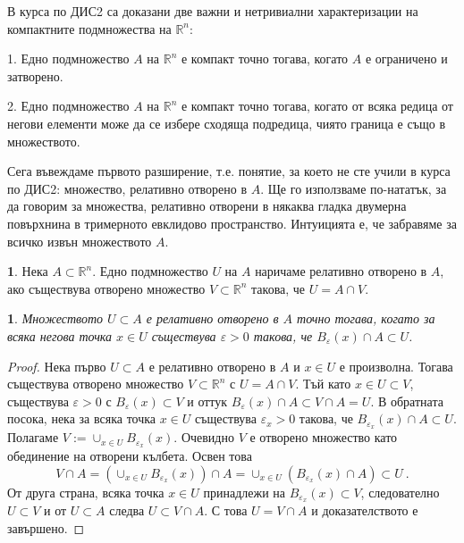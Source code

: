 \documentclass[11pt]{article}
\numberwithin{equation}{section}
\numberwithin{figure}{section}
\numberwithin{table}{section}
\theoremstyle{plain}
\theoremstyle{definition}
\newtheorem{defn}[thm]{\protect\definitionname}
\theoremstyle{remark}
\theoremstyle{definition}
\theoremstyle{remark}
\theoremstyle{plain}
\theoremstyle{definition}
\theoremstyle{definition}
\theoremstyle{plain}
\theoremstyle{plain}
\newtheorem{prop}[thm]{\protect\propositionname}
\theoremstyle{plain}
\theoremstyle{definition}
\theoremstyle{plain}
\providecommand{\definitionname}{Дефиниция}
\providecommand{\propositionname}{Твърдение}
\newcommand*{\R}{\mathbb{R}}
\begin{document}
В курса по ДИС2 са доказани две важни и нетривиални характеризации на компактните подмножества на $\R^n$:

1. Едно подмножество $A$ на $\R^n$ е компакт точно тогава, когато $A$ е ограничено и затворено.

2. Едно подмножество $A$ на $\R^n$ е компакт точно тогава, когато от всяка редица от негови елементи може да се избере сходяща подредица, чиято граница е също в множеството.

\bigskip

Сега въвеждаме първото разширение, т.е. понятие, за което не сте учили в курса по ДИС2: множество, релативно отворено в $A$. Ще го използваме по-нататък, за да говорим за множества, релативно отворени в някаква гладка двумерна повърхнина в тримерното евклидово пространство. Интуицията е, че забравяме за всичко извън множеството $A$.

\begin{defn} Нека $A \subset \R^n$. Едно подмножество $U$ на $A$ наричаме релативно отворено в $A$, ако съществува отворено множество $V\subset \R^n$ такова, че $U = A\cap V$.
\end{defn}
\begin{prop}
Множеството $U\subset A$ е релативно отворено в $A$ точно тогава, когато за всяка негова точка $x\in U$ съществува $\varepsilon >0$ такова, че $B_\varepsilon (x)\cap A \subset U$.
\end{prop}
\begin{proof}
Нека първо $U\subset A$ е релативно отворено в $A$ и $x\in U$ е произволна. Тогава съществува отворено множество $V\subset \R^n$ с $U = A\cap V$. Тъй като $x\in U\subset V$, съществува $\varepsilon >0$ с $B_\varepsilon (x) \subset V$ и оттук $B_\varepsilon (x)\cap A \subset V\cap A=U$. В обратната посока, нека за всяка точка $x\in U$ съществува $\varepsilon_x >0$ такова, че $B_{\varepsilon_x} (x)\cap A \subset U$. Полагаме
$V:= \cup_{ x\in U} B_{\varepsilon_x} (x)$. Очевидно $V$ е отворено множество като обединение на отворени кълбета. Освен това
$$V\cap A=\left(\cup_{ x\in U} B_{\varepsilon_x} (x)\right)\cap A=\cup_{ x\in U}\left( B_{\varepsilon_x} (x)\cap A\right)\subset U \ .$$
От друга страна, всяка точка $x\in U$ принадлежи на $B_{\varepsilon_x} (x) \subset V$, следователно $U\subset V$ и от $U\subset A$ следва $U\subset V\cap A$. С това $U= V\cap A$ и доказателството е завършено.
\end{proof}
\end{document}

